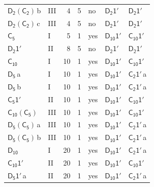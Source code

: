 \documentclass[10pt,a4paper]{article}
\numberwithin{equation}{section}
\newcommand{\grp}[1]{\mathsf{#1}}
\newcommand{\clsletter}[1]{\,{\scriptsize\color{black!55}#1}}
\begin{document}
{\begin{longtable}{@{}llrrlll@{}}
\href{D2-C2.pdf}{$\grp{D_{2}}(\grp{C_{2}})$}\clsletter{b} & III & 4 & 5 & no & \href{D2-1p.pdf}{$\grp{D_{2}1'}$} & \href{D2-1p.pdf}{$\grp{D_{2}1'}$}\\
\href{D2-C2.pdf}{$\grp{D_{2}}(\grp{C_{2}})$}\clsletter{c} & III & 4 & 5 & no & \href{D2-1p.pdf}{$\grp{D_{2}1'}$} & \href{D2-1p.pdf}{$\grp{D_{2}1'}$}\\
\href{../../../rotation/data/pdf/C5.pdf}{$\grp{C_{5}}$} & I & 5 & 1 & yes & \href{D10-1p.pdf}{$\grp{D_{10}1'}$} & \href{C10-1p.pdf}{$\grp{C_{10}1'}$}\\
\href{D2-1p.pdf}{$\grp{D_{2}1'}$} & II & 8 & 5 & no & \href{D2-1p.pdf}{$\grp{D_{2}1'}$} & \href{D2-1p.pdf}{$\grp{D_{2}1'}$}\\
\href{../../../rotation/data/pdf/C10.pdf}{$\grp{C_{10}}$} & I & 10 & 1 & yes & \href{D10-1p.pdf}{$\grp{D_{10}1'}$} & \href{C10-1p.pdf}{$\grp{C_{10}1'}$}\\
\href{../../../rotation/data/pdf/D5.pdf}{$\grp{D_{5}}$}\clsletter{a} & I & 10 & 1 & yes & \href{D10-1p.pdf}{$\grp{D_{10}1'}$} & \href{C2-1p.pdf}{$\grp{C_{2}1'}$}\clsletter{a}\\
\href{../../../rotation/data/pdf/D5.pdf}{$\grp{D_{5}}$}\clsletter{b} & I & 10 & 1 & yes & \href{D10-1p.pdf}{$\grp{D_{10}1'}$} & \href{C2-1p.pdf}{$\grp{C_{2}1'}$}\clsletter{a}\\
\href{C5-1p.pdf}{$\grp{C_{5}1'}$} & II & 10 & 1 & yes & \href{D10-1p.pdf}{$\grp{D_{10}1'}$} & \href{C10-1p.pdf}{$\grp{C_{10}1'}$}\\
\href{C10-C5.pdf}{$\grp{C_{10}}(\grp{C_{5}})$} & III & 10 & 1 & yes & \href{D10-1p.pdf}{$\grp{D_{10}1'}$} & \href{C10-1p.pdf}{$\grp{C_{10}1'}$}\\
\href{D5-C5.pdf}{$\grp{D_{5}}(\grp{C_{5}})$}\clsletter{a} & III & 10 & 1 & yes & \href{D10-1p.pdf}{$\grp{D_{10}1'}$} & \href{C2-1p.pdf}{$\grp{C_{2}1'}$}\clsletter{a}\\
\href{D5-C5.pdf}{$\grp{D_{5}}(\grp{C_{5}})$}\clsletter{b} & III & 10 & 1 & yes & \href{D10-1p.pdf}{$\grp{D_{10}1'}$} & \href{C2-1p.pdf}{$\grp{C_{2}1'}$}\clsletter{a}\\
\href{../../../rotation/data/pdf/D10.pdf}{$\grp{D_{10}}$} & I & 20 & 1 & yes & \href{D10-1p.pdf}{$\grp{D_{10}1'}$} & \href{C2-1p.pdf}{$\grp{C_{2}1'}$}\clsletter{a}\\
\href{C10-1p.pdf}{$\grp{C_{10}1'}$} & II & 20 & 1 & yes & \href{D10-1p.pdf}{$\grp{D_{10}1'}$} & \href{C10-1p.pdf}{$\grp{C_{10}1'}$}\\
\href{D5-1p.pdf}{$\grp{D_{5}1'}$}\clsletter{a} & II & 20 & 1 & yes & \href{D10-1p.pdf}{$\grp{D_{10}1'}$} & \href{C2-1p.pdf}{$\grp{C_{2}1'}$}\clsletter{a}\\

\end{longtable}}
\end{document}
